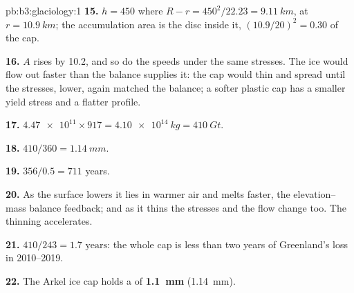 \begin{solution}{pb:b3:glaciology:1}
\textbf{15.} $h = 450$ where $R - r = 450^2/22.23 = \qty{9.11}{km}$, at
$r = \qty{10.9}{km}$; the accumulation area is the disc inside it, $(10.9/
20)^2 = 0.30$ of the cap.

\textbf{16.} $A$ rises by \num{10.2}, and so do the speeds under the same
stresses. The ice would flow out faster than the balance supplies it: the
cap would thin and spread until the stresses, lower, again matched the
balance; a softer plastic cap has a smaller yield stress and a flatter
profile.

\textbf{17.} $\num{4.47e11}\times917 = \qty{4.10e14}{kg} = \qty{410}{Gt}$.

\textbf{18.} $410/360 = \qty{1.14}{mm}$.

\textbf{19.} $356/0.5 = 711$ years.

\textbf{20.} As the surface lowers it lies in warmer air and melts faster,
the elevation--mass balance feedback; and as it thins the stresses and the
flow change too. The thinning accelerates.

\textbf{21.} $410/243 = \num{1.7}\text{ years}$: the whole cap is less than two
years of Greenland's loss in 2010--2019.

\textbf{22.} The Arkel ice cap holds a  of
\textbf{\qty[text-series-to-math=true]{1.1}{mm}} (\qty{1.14}{mm}).
\end{solution}
